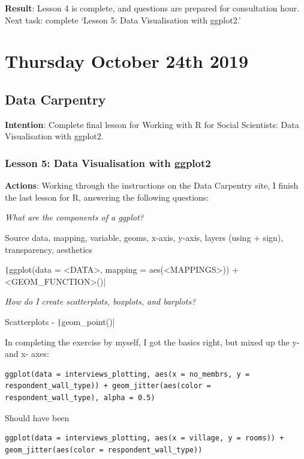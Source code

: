 \documentclass{article}
\begin{document}
\textbf{Result}: Lesson 4 is complete, and questions are prepared for consultation hour. Next task: complete ‘Lesson 5: Data Visualisation with ggplot2.’

\section{Thursday October 24th 2019}

\subsection{Data Carpentry}

\textbf{Intention}: Complete final lesson for Working with R for Social Scientists: Data Visualisation with ggplot2.

\subsubsection{Lesson 5: Data Visualisation with ggplot2}

\textbf{Actions}: Working through the instructions on the Data Carpentry site, I finish the last lesson for R, answering the following questions:

\textit{What are the components of a ggplot?}

Source data, mapping, variable, geoms, x-axis, y-axis, layers (using + sign), transparency, aesthetics

\texttt|ggplot(data = <DATA>, mapping = aes(<MAPPINGS>)) +  <GEOM_FUNCTION>()|

\textit{How do I create scatterplots, boxplots, and barplots?}

Scatterplots - \texttt|geom_point()|

In completing the exercise by myself, I got the basics right, but mixed up the y- and x- axes:

\begin{verbatim}
ggplot(data = interviews_plotting, aes(x = no_membrs, y = respondent_wall_type)) + geom_jitter(aes(color = respondent_wall_type), alpha = 0.5)
\end{verbatim}

Should have been
\begin{verbatim}
ggplot(data = interviews_plotting, aes(x = village, y = rooms)) + geom_jitter(aes(color = respondent_wall_type))
\end{verbatim}
\end{document}
